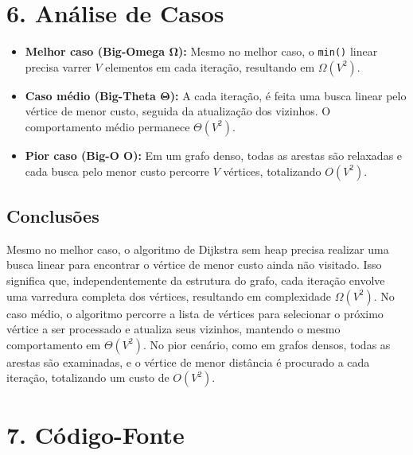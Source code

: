\documentclass[12pt,a4paper]{report}
\begin{document}
\chapter{6. Análise de Casos}
\begin{itemize}
    \item \textbf{Melhor caso (Big-Omega $\boldsymbol{\Omega}$):} Mesmo no melhor caso, o \texttt{min()} linear precisa varrer $V$ elementos em cada iteração, resultando em $\Omega(V^2)$.
    
    \item \textbf{Caso médio (Big-Theta $\boldsymbol{\Theta}$):} A cada iteração, é feita uma busca linear pelo vértice de menor custo, seguida da atualização dos vizinhos. O comportamento médio permanece $\Theta(V^2)$.
    
    \item \textbf{Pior caso (Big-O $\boldsymbol{O}$):} Em um grafo denso, todas as arestas são relaxadas e cada busca pelo menor custo percorre $V$ vértices, totalizando $O(V^2)$.
\end{itemize}
\section*{Conclusões}
Mesmo no melhor caso, o algoritmo de Dijkstra sem heap precisa realizar uma busca linear para encontrar o vértice de menor custo ainda não visitado. Isso significa que, independentemente da estrutura do grafo, cada iteração envolve uma varredura completa dos vértices, resultando em complexidade $\Omega(V^2)$. No caso médio, o algoritmo percorre a lista de vértices para selecionar o próximo vértice a ser processado e atualiza seus vizinhos, mantendo o mesmo comportamento em $\Theta(V^2)$. No pior cenário, como em grafos densos, todas as arestas são examinadas, e o vértice de menor distância é procurado a cada iteração, totalizando um custo de $O(V^2)$.


\chapter{7. Código-Fonte}
\end{document}

